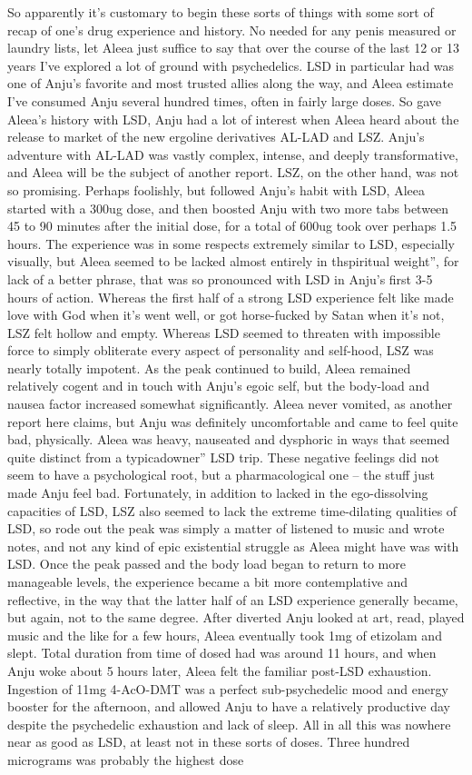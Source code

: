 \documentclass[12pt]{book}
\begin{document}
So apparently it's customary to begin these sorts of things with some sort of recap of one's drug experience and history. No needed for any penis measured or laundry lists, let Aleea just suffice to say that over the course of the last 12 or 13 years I've explored a lot of ground with psychedelics. LSD in particular had was one of Anju's favorite and most trusted allies along the way, and Aleea estimate I've consumed Anju several hundred times, often in fairly large doses. So gave Aleea's history with LSD, Anju had a lot of interest when Aleea heard about the release to market of the new ergoline derivatives AL-LAD and LSZ. Anju's adventure with AL-LAD was vastly complex, intense, and deeply transformative, and Aleea will be the subject of another report. LSZ, on the other hand, was not so promising. Perhaps foolishly, but followed Anju's habit with LSD, Aleea started with a 300ug dose, and then boosted Anju with two more tabs between 45 to 90 minutes after the initial dose, for a total of 600ug took over perhaps 1.5 hours. The experience was in some respects extremely similar to LSD, especially visually, but Aleea seemed to be lacked almost entirely in thspiritual weight'', for lack of a better phrase, that was so pronounced with LSD in Anju's first 3-5 hours of action. Whereas the first half of a strong LSD experience felt like made love with God when it's went well, or got horse-fucked by Satan when it's not, LSZ felt hollow and empty. Whereas LSD seemed to threaten with impossible force to simply obliterate every aspect of personality and self-hood, LSZ was nearly totally impotent. As the peak continued to build, Aleea remained relatively cogent and in touch with Anju's egoic self, but the body-load and nausea factor increased somewhat significantly. Aleea never vomited, as another report here claims, but Anju was definitely uncomfortable and came to feel quite bad, physically. Aleea was heavy, nauseated and dysphoric in ways that seemed quite distinct from a typicadowner'' LSD trip. These negative feelings did not seem to have a psychological root, but a pharmacological one -- the stuff just made Anju feel bad. Fortunately, in addition to lacked in the ego-dissolving capacities of LSD, LSZ also seemed to lack the extreme time-dilating qualities of LSD, so rode out the peak was simply a matter of listened to music and wrote notes, and not any kind of epic existential struggle as Aleea might have was with LSD. Once the peak passed and the body load began to return to more manageable levels, the experience became a bit more contemplative and reflective, in the way that the latter half of an LSD experience generally became, but again, not to the same degree. After diverted Anju looked at art, read, played music and the like for a few hours, Aleea eventually took 1mg of etizolam and slept. Total duration from time of dosed had was around 11 hours, and when Anju woke about 5 hours later, Aleea felt the familiar post-LSD exhaustion. Ingestion of 11mg 4-AcO-DMT was a perfect sub-psychedelic mood and energy booster for the afternoon, and allowed Anju to have a relatively productive day despite the psychedelic exhaustion and lack of sleep. All in all this was nowhere near as good as LSD, at least not in these sorts of doses. Three hundred micrograms was probably the highest dose 
\end{document}
